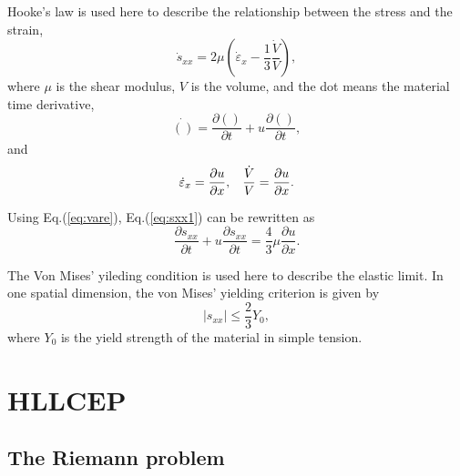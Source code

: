 \documentclass{article}
\theoremstyle{plain}\newtheorem{definition}{\sc{Definition}}
\theoremstyle{defination}\newtheorem{example}{Example}[section]
\numberwithin{equation}{section}
\numberwithin{table}{section}
\begin{document}
Hooke's law is used here to describe the relationship between the stress and the strain, 
\begin{equation}\label{eq:sxx1}
\dot{s}_{xx} = 2\mu \left(\dot{\varepsilon}_x-\frac{1}{3}\frac{\dot{V}}{V}\right),
\end{equation}
where $\mu$ is the shear modulus, $V$ is the volume, and the dot means the material time derivative,
\begin{equation}
  \dot{()} = \frac{\partial ()}{\partial t} + u \frac{\partial ()}{\partial t},
\end{equation}
and
\begin{equation}\label{eq:vare}
  \dot{\varepsilon}_x = \frac{\partial u}{\partial x}, \hspace{0.3cm} \frac{\dot{V}}{V} = \frac{\partial u}{\partial x}.
\end{equation}

Using Eq.(\ref{eq:vare}), Eq.(\ref{eq:sxx1}) can be rewritten as 
\begin{equation}
  \frac{\partial s_{xx}}{\partial t} + u \frac{\partial s_{xx}}{\partial t} =\frac{4}{3}\mu \frac{\partial u}{\partial x}.
\end{equation}

The Von Mises' yileding condition is used here to describe the elastic limit. In one spatial dimension, the von Mises' yielding criterion is given by
\begin{equation}
  |s_{xx}| \le \frac{2}{3}Y_0,
\end{equation}
where $Y_0$ is the yield strength of the material in simple tension.


\section{HLLCEP}
\subsection{The Riemann problem}
\end{document}
